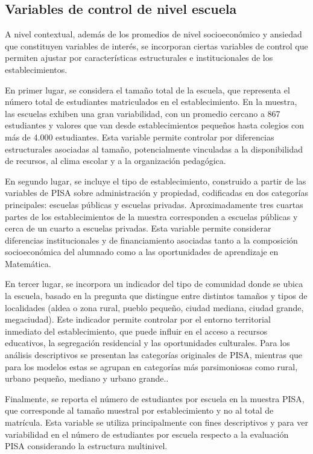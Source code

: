 \documentclass[
  spanish,
  a4paper,
  oneside]{scrbook}
\begin{document}
\endgroup

\subsection{Variables de control de nivel
escuela}\label{variables-de-control-de-nivel-escuela}

A nivel contextual, además de los promedios de nivel socioeconómico y
ansiedad que constituyen variables de interés, se incorporan ciertas
variables de control que permiten ajustar por características
estructurales e institucionales de los establecimientos.

En primer lugar, se considera el tamaño total de la escuela, que
representa el número total de estudiantes matriculados en el
establecimiento. En la muestra, las escuelas exhiben una gran
variabilidad, con un promedio cercano a 867 estudiantes y valores que
van desde establecimientos pequeños hasta colegios con más de 4.000
estudiantes. Esta variable permite controlar por diferencias
estructurales asociadas al tamaño, potencialmente vinculadas a la
disponibilidad de recursos, al clima escolar y a la organización
pedagógica.

En segundo lugar, se incluye el tipo de establecimiento, construido a
partir de las variables de PISA sobre administración y propiedad,
codificadas en dos categorías principales: escuelas públicas y escuelas
privadas. Aproximadamente tres cuartas partes de los establecimientos de
la muestra corresponden a escuelas públicas y cerca de un cuarto a
escuelas privadas. Esta variable permite considerar diferencias
institucionales y de financiamiento asociadas tanto a la composición
socioeconómica del alumnado como a las oportunidades de aprendizaje en
Matemática.

En tercer lugar, se incorpora un indicador del tipo de comunidad donde
se ubica la escuela, basado en la pregunta que distingue entre distintos
tamaños y tipos de localidades (aldea o zona rural, pueblo pequeño,
ciudad mediana, ciudad grande, megaciudad). Este indicador permite
controlar por el entorno territorial inmediato del establecimiento, que
puede influir en el acceso a recursos educativos, la segregación
residencial y las oportunidades culturales. Para los análisis
descriptivos se presentan las categorías originales de PISA, mientras
que para los modelos estas se agrupan en categorías más parsimoniosas
como rural, urbano pequeño, mediano y urbano grande..

Finalmente, se reporta el número de estudiantes por escuela en la
muestra PISA, que corresponde al tamaño muestral por establecimiento y
no al total de matrícula. Esta variable se utiliza principalmente con
fines descriptivos y para ver variabilidad en el número de estudiantes
por escuela respecto a la evaluación PISA considerando la estructura
multinivel.
\end{document}
